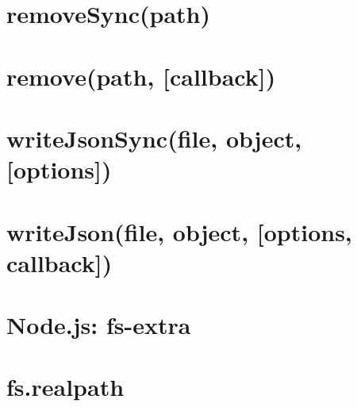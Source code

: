 \documentclass[twoside]{book}
\newcommand{\+}{\discretionary{\mbox{\scriptsize$\hookleftarrow$}}{}{}}
\begin{document}
\chapter{remove\+Sync(path)}
\label{md__c_1_workspace_demo_src_main_script_node_modules_fs-extra_docs_remove-sync}

\chapter{remove(path, \mbox{[}callback\mbox{]})}
\label{md__c_1_workspace_demo_src_main_script_node_modules_fs-extra_docs_remove}

\chapter{write\+Json\+Sync(file, object, \mbox{[}options\mbox{]})}
\label{md__c_1_workspace_demo_src_main_script_node_modules_fs-extra_docs_write_json-sync}

\chapter{write\+Json(file, object, \mbox{[}options, callback\mbox{]})}
\label{md__c_1_workspace_demo_src_main_script_node_modules_fs-extra_docs_write_json}

\chapter{Node.\+js\+: fs-\/extra}
\label{md__c_1_workspace_demo_src_main_script_node_modules_fs-extra__r_e_a_d_m_e}

\chapter{fs.\+realpath}
\label{md__c_1_workspace_demo_src_main_script_node_modules_fs_8realpath__r_e_a_d_m_e}

\end{document}
